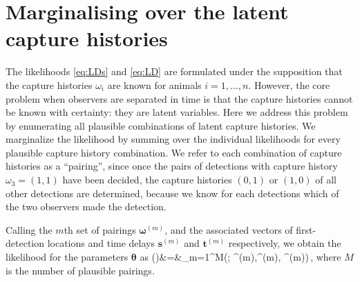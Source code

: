 \documentclass[useAMS, usenatbib, referee]{biom}\usepackage[]{graphicx}\usepackage[]{color}
\begin{document}

\section{Marginalising over the latent capture histories}

The likelihoods \eqref{eq:LDs} and \eqref{eq:LD} are formulated under the supposition that the capture histories $\omega_i$ are known for animals $i=1, \ldots, n$. However, the core problem when observers are separated in time is that the capture histories cannot be known with certainty: they are latent variables. Here we address this problem by enumerating all plausible combinations of latent capture histories. We marginalize the likelihood by summing over the individual likelihoods for every plausible capture history combination. We refer to each combination of capture histories as a ``pairing'', since once the pairs of detections with capture history $\omega_3=(1,1)$ have been decided, the capture histories $(0, 1)$ or $(1, 0)$ of all other detections are determined, because we know for each detections which of the two observers made the detection.

Calling the $m$th set of pairings $\bm{\omega}^{(m)}$, and the associated vectors of first-detection locations and time delays  $\bm{s}^{(m)}$ and $\bm{t}^{(m)}$ respectively, we obtain the likelihood for the parameters $\bm{\theta}$ as
\be
{}(\bm{\theta})&=&\sum_{m=1}^M\left(\bm{\theta}; ^{(m)},\bm{\omega}^{(m)}, ^{(m)}\right)\,,
\ee
\noindent
where $M$ is the number of plausible pairings.

\end{document}
